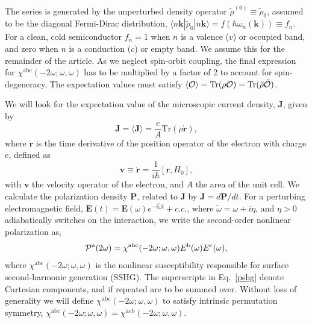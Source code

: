 \documentclass[floatfix,prb,aps,superscriptaddress,showpacs,11pt,preprint,letterpaper]{revtex4}
\begin{document}
The series is generated by the unperturbed density operator $\tilde{\rho}^{(0)}
\equiv \tilde{\rho}_{0}$, assumed to be the diagonal Fermi-Dirac distribution, 
$\langle n\mathbf{k}|\tilde{\rho}_{0}|n\mathbf{k}\rangle = 
f(\hbar\omega_{n}(\mathbf{k}))\equiv f_{n}$. For a clean, cold semiconductor 
$f_{n}=1$ when $n$ is a valence ($v$) or occupied band, and zero when $n$ is 
a conduction ($c$) or empty band. 
We assume this for the remainder of the  
article.  
As we neglect spin-orbit coupling, the
final expression for
$\chi^{\mathrm{a}\mathrm{b}\mathrm{c}}(-2\omega;\omega,\omega)$   
has to be multiplied by a factor of 2
to account for spin-degeneracy.
The expectation values must satisfy
$\langle{\cal O}\rangle = \mbox{Tr}({\rho}{\cal O}) = 
\mbox{Tr}(\tilde{\rho}\tilde{\cal O})$.  

We will look for the expectation value of the microscopic current density, 
$\mathbf{J}$, given by 
\begin{equation*}
\mathbf{J} = \langle{\mathbf{J}}\rangle 
           = \frac{e}{A}\mbox{Tr}({\rho}\dot{\mathbf{r}}),
\end{equation*}
where $\dot{\mathbf{r}}$ is the time derivative of the position operator of the
electron with charge $e$, defined as
\begin{equation}
\mathbf{v}\equiv \dot{\mathbf{r}}=\frac{1}{i\hbar }[\mathbf{r},H_0],  
\label{mv}
\end{equation}
with $\mathbf{v}$ the velocity operator of the electron, and $A$ the
area of the unit cell. We calculate the polarization density 
$\mathbf{P}$, related to $\mathbf{J}$ by
$\mathbf{J}=d\mathbf{P}/dt$. For a 
perturbing electromagnetic field, $\mathbf{E}(t)=
\mathbf{E}(\omega )e^{-i\tilde{\omega} t}+c.c.$,
where $\tilde\omega=\omega+i\eta $,
and $\eta >0$ adiabatically switches on the interaction,
we write the second-order nonlinear
polarization as, 
\begin{equation}
{\mathbf{\cal P}}^{\mathrm{a}}(2\omega)=
\chi^{\mathrm{a}\mathrm{b}\mathrm{c}}(-2\omega;\omega,\omega)
E^{\mathrm{b}}(\omega)E^{\mathrm{c}}(\omega),  
\label{pshg}
\end{equation}
where $\chi^{\mathrm{a}\mathrm{b}\mathrm{c}}(-2\omega ;\omega ,\omega )$ is the nonlinear
susceptibility responsible for surface second-harmonic generation
(SSHG). 
The 
superscripts in Eq.~\eqref{pshg} denote Cartesian components, and if
repeated are to be summed over. Without loss of generality we will
define $\chi^{\mathrm{a}\mathrm{b}\mathrm{c}}(-2\omega;\omega,\omega)$
 to satisfy intrinsic permutation
symmetry, 
$\chi^{\mathrm{a}\mathrm{b}\mathrm{c}}(-2\omega ;\omega ,\omega )
=\chi^{\mathrm{a}\mathrm{c}\mathrm{b}}(-2\omega ;\omega,\omega )$.
\end{document}
